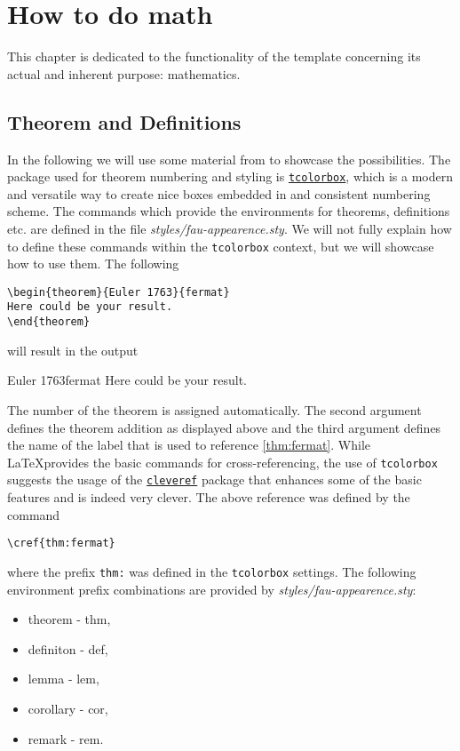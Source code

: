 \chapter{How to do math}\label{ch:math}
This chapter is dedicated to the functionality of the template concerning its actual and 
inherent purpose: mathematics. 
\section{Theorem and Definitions}
In the following we will use some material from \cite{FineProp2015} to showcase the possibilities. 
The package used for theorem numbering and styling is 
\hyperlink{https://www.ctan.org/pkg/tcolorbox}{\texttt{tcolorbox}}, which is a modern and 
versatile way to create nice boxes embedded in and consistent numbering scheme. The 
commands which provide the environments for theorems, definitions etc. are defined in the 
file \textit{styles/fau-appearence.sty}. We will not fully explain how to define these commands 
within the \texttt{tcolorbox} context, but we will showcase how to use them. The following
\begin{lstlisting}[language={[LaTeX]TeX}]
\begin{theorem}{Euler 1763}{fermat}
Here could be your result.
\end{theorem}
\end{lstlisting}
will result in the output
\begin{theorem}{Euler 1763}{fermat}
Here could be your result.
\end{theorem}
The number of the theorem is assigned automatically. The second argument defines the theorem 
addition as displayed above and the third argument defines the name of the label that is used 
to reference \cref{thm:fermat}. While \LaTeX provides the basic commands for cross-referencing, 
the use of \texttt{tcolorbox} suggests the usage of the 
\hyperlink{https://ctan.org/pkg/cleveref}{\texttt{cleveref}} package that enhances some 
of the basic features and is indeed very clever. The above reference was defined by the 
command
\begin{lstlisting}[language={[LaTeX]TeX}]
\cref{thm:fermat}
\end{lstlisting}
where the prefix \texttt{thm:} was defined in the \texttt{tcolorbox} settings. The following 
environment prefix combinations are provided by \textit{styles/fau-appearence.sty}: 
\begin{itemize}
\item theorem - thm,
\item definiton - def,
\item lemma - lem,
\item corollary - cor,
\item remark - rem.
\end{itemize}
